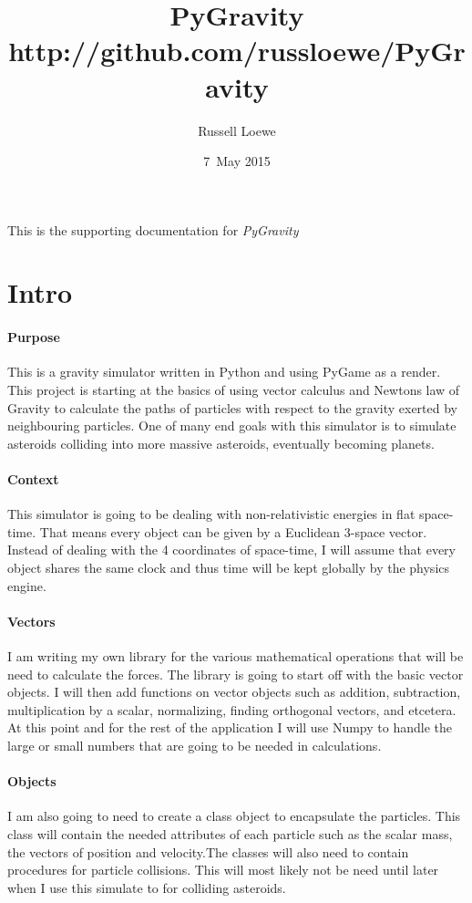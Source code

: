 \documentclass[15pt]{report}
\title{PyGravity \\
		\small http://github.com/russloewe/PyGravity}
\author{Russell Loewe}
\date{7~May 2015}
\begin{document}
\maketitle

\indent
This is the supporting documentation for
\textit{PyGravity} 

\tableofcontents

\newpage



\section{Intro}
\indent \paragraph{Purpose} This is a gravity simulator written in Python and using PyGame as a render. This project is starting at the basics of using vector calculus and Newtons law of Gravity to calculate the paths of particles with respect to the gravity exerted by neighbouring particles. One of many end goals with this simulator is to simulate asteroids colliding into more massive asteroids, eventually becoming planets.
\indent \paragraph{Context} This simulator is going to be dealing with non-relativistic energies in flat space-time. That means every object can be given by a Euclidean 3-space vector. Instead of dealing with the 4 coordinates of space-time, I will assume that every object shares the same clock and thus time will be kept globally by the physics engine. 
\indent \paragraph{Vectors}I am writing my own library for  the various mathematical operations that will be need to calculate the forces. The library is going to start off with the basic vector objects. I will then add functions on vector objects such as addition, subtraction, multiplication by a scalar, normalizing, finding orthogonal vectors, and etcetera. At this point and for the rest of the application I will use Numpy to handle the large or small numbers that are going to be needed in calculations.
\indent \paragraph{Objects} I am also going to need to create a class object to encapsulate the particles. This class will contain the needed attributes of each particle such as the scalar mass, the vectors of position and velocity.The classes will also need to contain procedures for particle collisions. This will most likely not be need until later when I use this simulate to for colliding asteroids.
\end{document}
